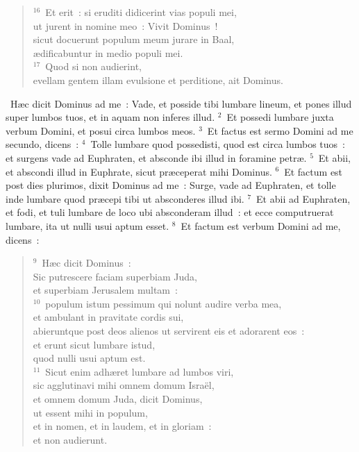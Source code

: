 \begin{flushleft}
\begin{verse}
${}^{16}$~Et erit~: si eruditi didicerint vias populi mei,\\ ut jurent in nomine meo~: Vivit Dominus~!\\ sicut docuerunt populum meum jurare in Baal,\\ \ae dificabuntur in medio populi mei.\\
${}^{17}$~Quod si non audierint,\\ evellam gentem illam evulsione et perditione, ait Dominus.\end{verse}\end{flushleft}


~\lettrine[lines=10,image=true,loversize=0.05,lraise=-0.03]{H}{}\ae c dicit Dominus ad me~: Vade, et posside tibi lumbare lineum, et pones illud super lumbos tuos, et in aquam non inferes illud.
${}^{2}$~Et possedi lumbare juxta verbum Domini, et posui circa lumbos meos.
${}^{3}$~Et factus est sermo Domini ad me secundo, dicens~:
${}^{4}$~Tolle lumbare quod possedisti, quod est circa lumbos tuos~: et surgens vade ad Euphraten, et absconde ibi illud in foramine petr\ae .
${}^{5}$~Et abii, et abscondi illud in Euphrate, sicut pr\ae ceperat mihi Dominus.
${}^{6}$~Et factum est post dies plurimos, dixit Dominus ad me~: Surge, vade ad Euphraten, et tolle inde lumbare quod pr\ae cepi tibi ut absconderes illud ibi.
${}^{7}$~Et abii ad Euphraten, et fodi, et tuli lumbare de loco ubi absconderam illud~: et ecce computruerat lumbare, ita ut nulli usui aptum esset.
${}^{8}$~Et factum est verbum Domini ad me, dicens~:
\begin{flushleft}\begin{verse}${}^{9}$~H\ae c dicit Dominus~:\\ Sic putrescere faciam superbiam Juda,\\ et superbiam Jerusalem multam~:\\
${}^{10}$~populum istum pessimum qui nolunt audire verba mea,\\ et ambulant in pravitate cordis sui,\\ abieruntque post deos alienos ut servirent eis et adorarent eos~:\\ et erunt sicut lumbare istud,\\ quod nulli usui aptum est.\\
${}^{11}$~Sicut enim adh\ae ret lumbare ad lumbos viri,\\ sic agglutinavi mihi omnem domum Isra\"el,\\ et omnem domum Juda, dicit Dominus,\\ ut essent mihi in populum,\\ et in nomen, et in laudem, et in gloriam~:\\ et non audierunt.\end{verse}\end{flushleft}


